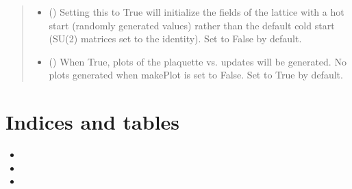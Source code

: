 \documentclass[letterpaper,10pt,english]{sphinxmanual}
\begin{document}
\begin{fulllineitems}
\begin{quote}
\begin{description}
\begin{itemize}
\item {} 
 () \textendash{} Setting this to True will initialize the fields of the lattice
with a hot start (randomly generated values) rather than the
default cold start (SU(2) matrices set to the identity). Set to
False by default.

\item {} 
 () \textendash{} When True, plots of the plaquette vs. updates will be
generated. No plots generated when makePlot is set to False.
Set to True by default.

\end{itemize}

\end{description}\end{quote}

\end{fulllineitems}



\chapter{Indices and tables}
\label{\detokenize{index:indices-and-tables}}\begin{itemize}
\item {} 

\item {} 

\item {} 

\end{itemize}


\renewcommand{\indexname}{Python Module Index}
\begin{sphinxtheindex}
\let\bigletter\sphinxstyleindexlettergroup
\bigletter{d}
\item\relax{}
\indexspace
\bigletter{f}
\item\relax{}
\indexspace
\bigletter{s}
\item\relax{}
\end{sphinxtheindex}

\renewcommand{\indexname}{Index}
\printindex
\end{document}
